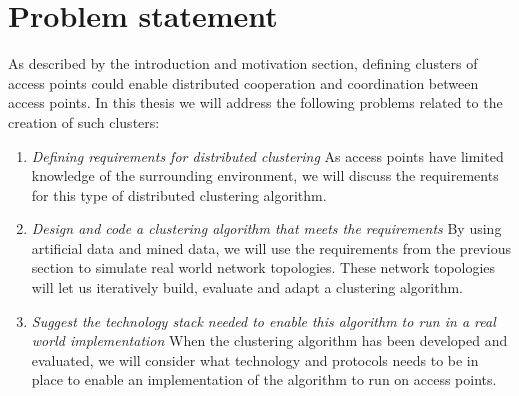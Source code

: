 \section{Problem statement}
As described by the introduction and motivation section, defining clusters of access points could enable distributed
cooperation and coordination between access points. In this thesis we will address the following problems related to the creation of such clusters:
\begin{enumerate}
	\item	\textit{Defining requirements for distributed clustering}\newline
		As access points have limited knowledge of the surrounding environment, we will discuss the requirements
		for this type of distributed clustering algorithm.

	\item \textit{Design and code a clustering algorithm that meets the requirements}\newline
		By using artificial data and mined data, we will use the requirements from the previous section to simulate real world network topologies. These network
		topologies will let us iteratively build, evaluate and adapt a clustering algorithm.
		
	\item \textit{Suggest the technology stack needed to enable this algorithm to run in a real world implementation }\newline
		When the clustering algorithm has been developed and evaluated, we will consider what technology and protocols needs to be in place to enable
		an implementation of the algorithm to run on access points. 
\end{enumerate}

